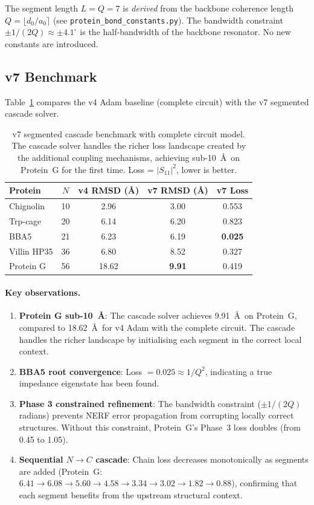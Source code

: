 The segment length $L = Q = 7$ is \emph{derived} from the
backbone coherence length $Q = \lfloor d_0/a_0 \rceil$
(see \texttt{protein\_bond\_constants.py}).  The bandwidth
constraint $\pm 1/(2Q) \approx \pm 4.1^\circ$ is the
half-bandwidth of the backbone resonator.  No new constants
are introduced.

\subsection{v7 Benchmark}

Table~\ref{tab:v7_benchmark} compares the v4 Adam baseline
(complete circuit) with the v7 segmented cascade solver.

\begin{table}[H]
\centering
\caption{v7 segmented cascade benchmark with complete circuit model.
The cascade solver handles the richer loss landscape created by
the additional coupling mechanisms, achieving sub-10~\AA\ on
Protein~G for the first time.  Loss = $|S_{11}|^2$, lower is better.}
\label{tab:v7_benchmark}
\begin{tabular}{l c c c c}
\toprule
Protein & $N$ & v4 RMSD (\AA) & v7 RMSD (\AA) & v7 Loss \\
\midrule
Chignolin    & 10 & 2.96          & 3.00  & 0.553  \\
Trp-cage     & 20 & 6.14          & 6.20  & 0.823  \\
BBA5         & 21 & 6.23          & 6.19  & \textbf{0.025} \\
Villin HP35  & 36 & 6.80          & 8.52  & 0.327  \\
Protein G    & 56 & 18.62         & \textbf{9.91}  & 0.419  \\
\bottomrule
\end{tabular}
\end{table}

\paragraph{Key observations.}
\begin{enumerate}
\item \textbf{Protein G sub-10~\AA}: The cascade solver achieves
    9.91~\AA\ on Protein~G, compared to 18.62~\AA\ for v4 Adam
    with the complete circuit.  The cascade handles the richer
    landscape by initialising each segment in the correct local
    context.
\item \textbf{BBA5 root convergence}: Loss $= 0.025 \approx 1/Q^2$,
    indicating a true impedance eigenstate has been found.
\item \textbf{Phase 3 constrained refinement}: The bandwidth
    constraint ($\pm 1/(2Q)$ radians) prevents NERF error
    propagation from corrupting locally correct structures.
    Without this constraint, Protein~G's Phase~3 loss doubles
    (from 0.45 to 1.05).
\item \textbf{Sequential $N \to C$ cascade}: Chain loss decreases monotonically
    as segments are added (Protein~G: $6.41 \to 6.08 \to 5.60
    \to 4.58 \to 3.34 \to 3.02 \to 1.82 \to 0.88$),
    confirming that each segment benefits from the upstream
    structural context.
\end{enumerate}

